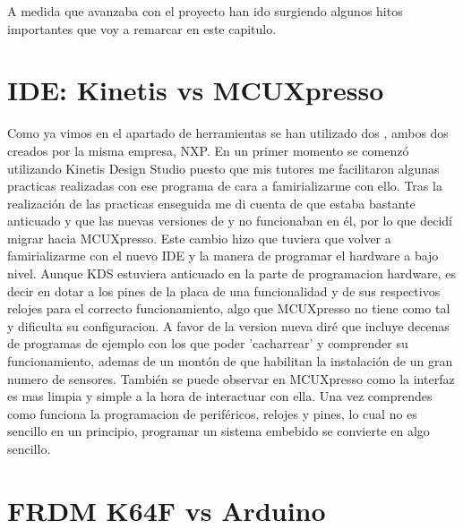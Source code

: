 
A medida que avanzaba con el proyecto han ido surgiendo algunos hitos importantes que voy a remarcar en este capitulo.

\section{IDE: Kinetis vs MCUXpresso}\label{sec:ARKinetisvsMCUX}
Como ya vimos en el apartado de herramientas se han utilizado dos , ambos dos creados por la misma empresa, NXP. En un primer momento se comenzó utilizando Kinetis Design Studio puesto que mis tutores me facilitaron algunas practicas realizadas con ese programa de cara a famirializarme con ello. Tras la realización de las practicas enseguida me di cuenta de que estaba bastante anticuado y que las nuevas versiones de  y  no funcionaban en él, por lo que decidí migrar hacia MCUXpresso. Este cambio hizo que tuviera que volver a famirializarme con el nuevo IDE y la manera de programar el hardware a bajo nivel. Aunque KDS estuviera anticuado en la parte de programacion hardware, es decir en dotar a los pines de la placa de una funcionalidad y de sus respectivos relojes para el correcto funcionamiento, algo que MCUXpresso no tiene como tal y dificulta su configuracion. A favor de la version nueva diré que incluye decenas de programas de ejemplo con los que poder 'cacharrear' y comprender su funcionamiento, ademas de un montón de  que habilitan la instalación de un gran numero de sensores. También se puede observar en MCUXpresso como la interfaz es mas limpia y simple a la hora de interactuar con ella. Una vez comprendes como funciona la programacion de periféricos, relojes y pines, lo cual no es sencillo en un principio, programar un sistema embebido se convierte en algo sencillo.

\section{FRDM K64F vs Arduino}\label{sec:ARK64FvsArduino}

